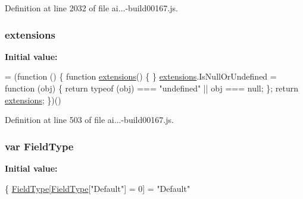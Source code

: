 Definition at line 2032 of file ai...-\/build00167.\+js.

\subsubsection[{\texorpdfstring{extensions}{extensions}}]{ extensions}\hypertarget{_scripts_2ai_80_822_89-build00167_8js_a9ce4e17b92e5debce1c72727f3bdd551}{}\label{_scripts_2ai_80_822_89-build00167_8js_a9ce4e17b92e5debce1c72727f3bdd551}
{\bfseries Initial value\+:}
\begin{DoxyCode}
= (\textcolor{keyword}{function} () \{
            \textcolor{keyword}{function} \hyperlink{obj_2_release_2_package_2_package_tmp_2_scripts_2ai_80_822_89-build00167_8js_a9ce4e17b92e5debce1c72727f3bdd551}{extensions}() \{
            \}
            \hyperlink{obj_2_release_2_package_2_package_tmp_2_scripts_2ai_80_822_89-build00167_8js_a9ce4e17b92e5debce1c72727f3bdd551}{extensions}.IsNullOrUndefined = \textcolor{keyword}{function} (obj) \{
                \textcolor{keywordflow}{return} typeof (obj) === \textcolor{stringliteral}{"undefined"} || obj === null;
            \};
            \textcolor{keywordflow}{return} \hyperlink{obj_2_release_2_package_2_package_tmp_2_scripts_2ai_80_822_89-build00167_8js_a9ce4e17b92e5debce1c72727f3bdd551}{extensions};
        \})()
\end{DoxyCode}


Definition at line 503 of file ai...-\/build00167.\+js.

\subsubsection[{\texorpdfstring{Field\+Type}{FieldType}}]{\setlength{\rightskip}{0pt plus 5cm}var Field\+Type}\hypertarget{_scripts_2ai_80_822_89-build00167_8js_a21475a2b33a5a873fc477ad4b7f274d7}{}\label{_scripts_2ai_80_822_89-build00167_8js_a21475a2b33a5a873fc477ad4b7f274d7}
{\bfseries Initial value\+:}
\begin{DoxyCode}
\{
            \hyperlink{obj_2_release_2_package_2_package_tmp_2_scripts_2ai_80_822_89-build00167_8js_a21475a2b33a5a873fc477ad4b7f274d7}{FieldType}[\hyperlink{obj_2_release_2_package_2_package_tmp_2_scripts_2ai_80_822_89-build00167_8js_a21475a2b33a5a873fc477ad4b7f274d7}{FieldType}[\textcolor{stringliteral}{"Default"}] = 0] = \textcolor{stringliteral}{"Default"}
\end{DoxyCode}


